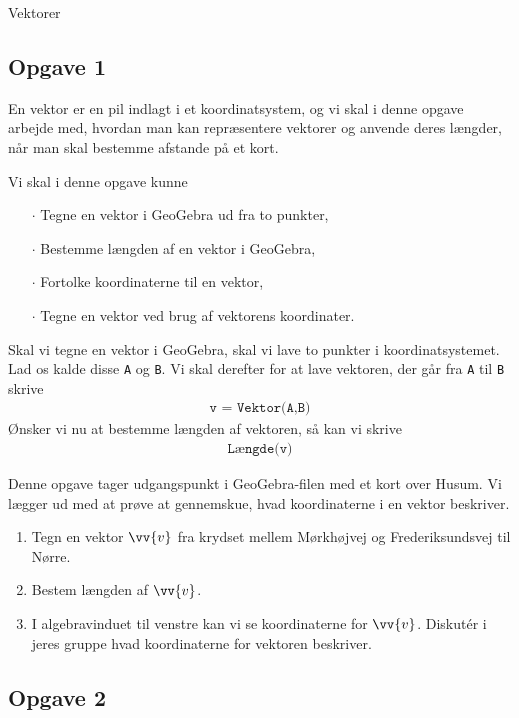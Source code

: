 
\begin{center}
\Huge
Vektorer
\end{center}

\subsection*{Opgave 1}
En vektor er en pil indlagt i et koordinatsystem, og vi skal i denne opgave arbejde med, hvordan man kan repræsentere vektorer og anvende deres længder, når man skal bestemme afstande på et kort. 

Vi skal i denne opgave kunne
\begin{itemize}
	\item[$\cdot$] Tegne en vektor i GeoGebra ud fra to punkter,
	\item[$\cdot$] Bestemme længden af en vektor i GeoGebra,
	\item[$\cdot$] Fortolke koordinaterne til en vektor,
	\item[$\cdot$] Tegne en vektor ved brug af vektorens koordinater.
\end{itemize}

Skal vi tegne en vektor i GeoGebra, skal vi lave to punkter i koordinatsystemet. Lad os kalde disse \texttt{A} og \texttt{B}. Vi skal derefter for at lave vektoren, der går fra \texttt{A} til \texttt{B} skrive
\begin{align*}
	\texttt{v = Vektor(A,B)}
\end{align*}
Ønsker vi nu at bestemme længden af vektoren, så kan vi skrive 
\begin{align*}
	\texttt{Længde(v)}
\end{align*}



Denne opgave tager udgangspunkt i GeoGebra-filen med et kort over Husum. Vi lægger ud med at prøve at gennemskue, hvad koordinaterne i en vektor beskriver.

\begin{enumerate}[label = \roman*)]
	\item Tegn en vektor $\vv{v}$ fra krydset mellem Mørkhøjvej og Frederiksundsvej til Nørre.
	\item Bestem længden af $\vv{v}$.
	\item I algebravinduet til venstre kan vi se koordinaterne for $\vv{v}$. Diskutér i jeres gruppe hvad koordinaterne for vektoren beskriver. 
\end{enumerate}

\newpage
\subsection*{Opgave 2}

